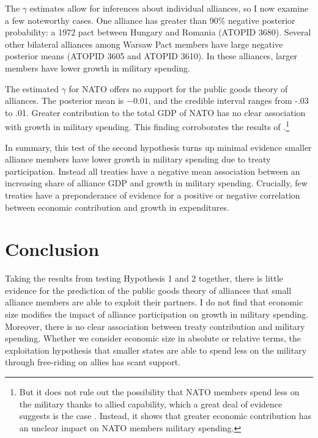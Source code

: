 \documentclass[12pt]{article}
\begin{document}
The $\gamma$ estimates allow for inferences about individual alliances, so I now examine a few noteworthy cases. 
One alliance has greater than 90\% negative posterior probability: a 1972 pact between Hungary and Romania (ATOPID 3680). 
Several other bilateral alliances among Warsaw Pact members have large negative posterior means (ATOPID 3605 and ATOPID 3610). 
In these alliances, larger members have lower growth in military spending. 

 
The estimated $\gamma$ for NATO offers no support for the public goods theory of alliances. 
The posterior mean is $-0.01$, and the credible interval ranges from -.03 to .01.  
Greater contribution to the total GDP of NATO has no clear association with growth in military spending. 
This finding corroborates the results of \citet{PluemperNeumayer2015}.\footnote{But it does not rule out the possibility that NATO members spend less on the military thanks to allied capability, which a great deal of evidence suggests is the case \citep{GeorgeSandler2017}. Instead, it shows that greater economic contribution has an unclear impact on NATO members military spending.}


In summary, this test of the second hypothesis turns up minimal evidence smaller alliance members have lower growth in military spending due to treaty participation. 
Instead all treaties have a negative mean association between an increasing share of alliance GDP and growth in military spending. 
Crucially, few treaties have a preponderance of evidence for a positive or negative correlation between economic contribution and growth in expenditures.  
 


\section{Conclusion}

Taking the results from testing Hypothesis 1 and 2 together, there is little evidence for the prediction of the public goods theory of alliances that small alliance members are able to exploit their partners. 
I do not find that economic size modifies the impact of alliance participation on growth in military spending.
Moreover, there is no clear association between treaty contribution and military spending. 
Whether we consider economic size in absolute or relative terms, the exploitation hypothesis that smaller states are able to spend less on the military through free-riding on allies has scant support. 
\end{document}
